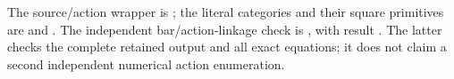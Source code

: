 \begin{remark}\label{C:middle-five-four-six-certificates}
The source/action wrapper is
; the literal categories and
their square primitives are
 and
.
The independent bar/action-linkage check is
, with result
.
The latter checks the complete retained output and all exact equations;
it does not claim a second independent numerical action enumeration.
\end{remark}

